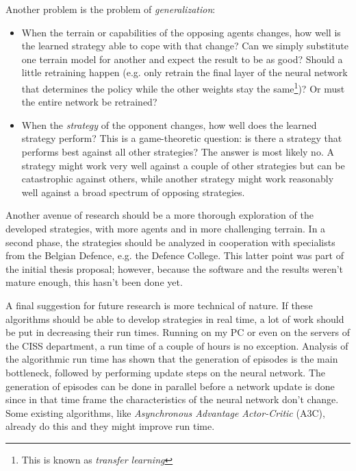 Another problem is the problem of \emph{generalization}:
\begin{itemize}
    \item When the terrain or capabilities of the opposing agents changes, how well is the learned strategy able to cope with that change? Can we simply substitute one terrain model for another and expect the result to be as good? Should a little retraining happen (e.g. only retrain the final layer of the neural network that determines the policy while the other weights stay the same\footnote{This is known as \emph{transfer learning}})? Or must the entire network be retrained?
    \item When the \emph{strategy} of the opponent changes, how well does the learned strategy perform? This is a game-theoretic question: is there a strategy that performs best against all other strategies? The answer is most likely no. A strategy might work very well against a couple of other strategies but can be catastrophic against others, while another strategy might work reasonably well against a broad spectrum of opposing strategies.
\end{itemize}

Another avenue of research should be a more thorough exploration of the developed strategies, with more agents and in more challenging terrain. In a second phase, the strategies should be analyzed in cooperation with specialists from the Belgian Defence, e.g. the Defence College. This latter point was part of the initial thesis proposal; however, because the software and the results weren't mature enough, this hasn't been done yet.

A final suggestion for future research is more technical of nature. If these algorithms should be able to develop strategies in real time, a lot of work should be put in decreasing their run times. Running on my PC or even on the servers of the CISS department, a run time of a couple of hours is no exception. Analysis of the algorithmic run time has shown that the generation of episodes is the main bottleneck, followed by performing update steps on the neural network. The generation of episodes can be done in parallel before a network update is done since in that time frame the characteristics of the neural network don't change. Some existing algorithms, like \emph{Asynchronous Advantage Actor-Critic} (A3C)\cite{mnih2016asynchronous}, already do this and they might improve run time.
